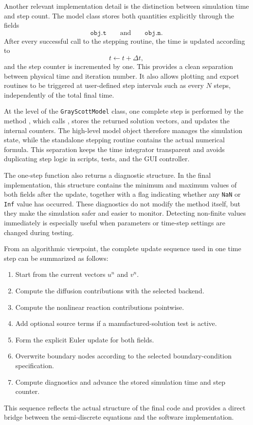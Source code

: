 Another relevant implementation detail is the distinction between simulation time and step count. The model class stores both quantities explicitly through the fields
\[
\texttt{obj.t}
\qquad \text{and} \qquad
\texttt{obj.n}.
\]
After every successful call to the stepping routine, the time is updated according to
\[
t \leftarrow t + \Delta t,
\]
and the step counter is incremented by one. This provides a clean separation between physical time and iteration number. It also allows plotting and export routines to be triggered at user-defined step intervals such as every $N$ steps, independently of the total final time.

At the level of the \texttt{GrayScottModel} class, one complete step is performed by the method , which calls , stores the returned solution vectors, and updates the internal counters. The high-level model object therefore manages the simulation state, while the standalone stepping routine contains the actual numerical formula. This separation keeps the time integrator transparent and avoids duplicating step logic in scripts, tests, and the GUI controller.

The one-step function also returns a diagnostic structure. In the final implementation, this structure contains the minimum and maximum values of both fields after the update, together with a flag indicating whether any \texttt{NaN} or \texttt{Inf} value has occurred. These diagnostics do not modify the method itself, but they make the simulation safer and easier to monitor. Detecting non-finite values immediately is especially useful when parameters or time-step settings are changed during testing.

From an algorithmic viewpoint, the complete update sequence used in one time step can be summarized as follows:
\begin{enumerate}
    \item Start from the current vectors $u^n$ and $v^n$.
    \item Compute the diffusion contributions with the selected backend.
    \item Compute the nonlinear reaction contributions pointwise.
    \item Add optional source terms if a manufactured-solution test is active.
    \item Form the explicit Euler update for both fields.
    \item Overwrite boundary nodes according to the selected boundary-condition specification.
    \item Compute diagnostics and advance the stored simulation time and step counter.
\end{enumerate}
This sequence reflects the actual structure of the final code and provides a direct bridge between the semi-discrete equations and the software implementation.

